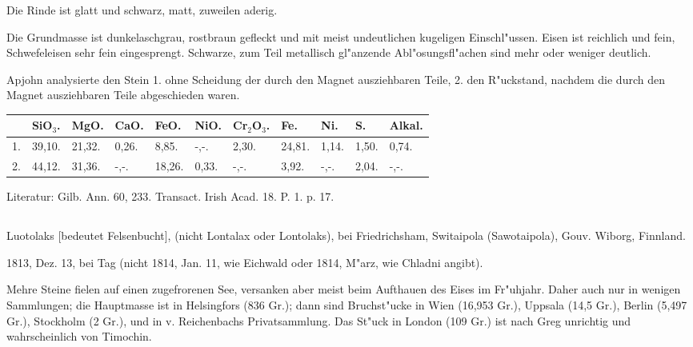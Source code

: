 \documentclass[a4paper, 11pt, oneside]{article}
\begin{document}
Die Rinde ist glatt und schwarz, matt, zuweilen aderig.

Die Grundmasse ist dunkelaschgrau, rostbraun gefleckt und mit meist undeutlichen kugeligen Einschl"ussen. Eisen ist reichlich und fein, Schwefeleisen sehr fein eingesprengt. Schwarze, zum Teil metallisch gl"anzende Abl"osungsfl"achen sind mehr oder weniger deutlich.

Apjohn analysierte den Stein 1. ohne Scheidung der durch den Magnet ausziehbaren Teile, 2. den R"uckstand, nachdem die durch den Magnet ausziehbaren Teile abgeschieden waren.
\begin{table}[!ht]
    \centering\swabfamily\Large
    \begin{tabular}{p{3mm} p{7mm} p{7mm} p{7mm} p{7mm} p{7mm} p{10mm} p{6mm} p{6mm} p{6mm} p{6mm}}
         & SiO$_{3}$. & MgO. & CaO. & FeO. & NiO. & Cr$_{2}$O$_{3}$. & Fe. & Ni. & S. & Alkal. \\ \hline
        1. & 39,10. & 21,32. & 0,26. & 8,85. & -,-. & 2,30. & 24,81. & 1,14. & 1,50. & 0,74. \\
        2. & 44,12. & 31,36. & -,-. & 18,26. & 0,33. & -,-. & 3,92. & -,-. & 2,04. & -,-. \\
    \end{tabular}
\end{table}

\normalsize
Literatur: Gilb. Ann. 60, 233. Transact. Irish Acad. 18. P. 1. p. 17.
\subsection{}
\LARGE
\paragraph{}
Luotolaks [bedeutet Felsenbucht], (nicht Lontalax oder Lontolaks), bei Friedrichsham, Switaipola (Sawotaipola), Gouv. Wiborg, Finnland.

1813, Dez. 13, bei Tag (nicht 1814, Jan. 11, wie Eichwald oder 1814, M"arz, wie Chladni angibt).

Mehre Steine fielen auf einen zugefrorenen See, versanken aber meist beim Aufthauen des Eises im Fr"uhjahr. Daher auch nur in wenigen Sammlungen; die Hauptmasse ist in Helsingfors (836 Gr.); dann sind Bruchst"ucke in Wien (16,953 Gr.), Uppsala (14,5 Gr.), Berlin (5,497 Gr.), Stockholm (2 Gr.), und in v. Reichenbachs Privatsammlung. Das St"uck in London (109 Gr.) ist nach Greg unrichtig und wahrscheinlich von Timochin.
\end{document}
